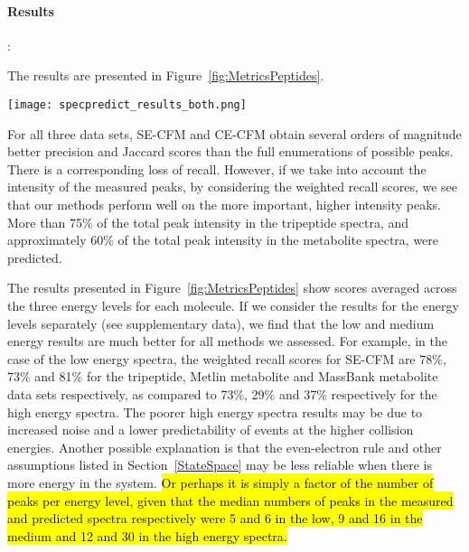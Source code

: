 \paragraph{Results}:

The results are presented in Figure~\ref{fig:MetricsPeptides}.
\begin{figure*}
\begin{center}
\texttt{[image: specpredict\_results\_both.png]}
\caption{Spectrum prediction results for tripeptides (left), metabolites from Metlin (middle) and metabolites from MassBank (right). The x-axes show the five metrics: Weighted Recall (WR), Weighted Precision (WP), Recall (R), Precision (P) and Jaccard (J), averaged across the three energy levels for each test molecule. Bars display mean scores  standard error. In each plot, note that the y-axis for Jaccard (on right) is different from the others (on left).}
\label{fig:MetricsPeptides}
\end{center}
\end{figure*}
For all three data sets, SE-CFM and CE-CFM obtain several orders of magnitude better precision and Jaccard scores than the full enumerations of possible peaks.
There is a corresponding loss of recall. However, if we take into account the intensity of the measured peaks, by considering the weighted recall scores, we see that our methods perform well on the more important, higher intensity peaks. 
More than 75\% of the total peak intensity in the tripeptide spectra, and approximately 60\% of the total peak intensity in the metabolite spectra, were predicted.

The results presented in Figure~\ref{fig:MetricsPeptides} show scores averaged across the three energy levels for each molecule. If we consider the results for the energy levels separately (see supplementary data), we find that the low and medium energy results are much better for all methods we assessed.
For example, in the case of the low energy spectra, the weighted recall scores for SE-CFM are 78\%, 73\% and 81\% for the tripeptide, Metlin metabolite and MassBank metabolite data sets respectively, as compared to 73\%, 29\% and 37\% respectively for the high energy spectra.
The poorer high energy spectra results may be due to increased noise and a lower predictability of events at the higher collision energies. 
Another possible explanation is that the even-electron rule and other assumptions listed in Section~\ref{StateSpace} may be less reliable when there is more energy in the system. \hl{Or perhaps it is simply a factor of the number of peaks per energy level, given that the median numbers of peaks in the measured and predicted spectra respectively were 5 and 6 in the low, 9 and 16 in the medium and 12 and 30 in the high energy spectra. }

